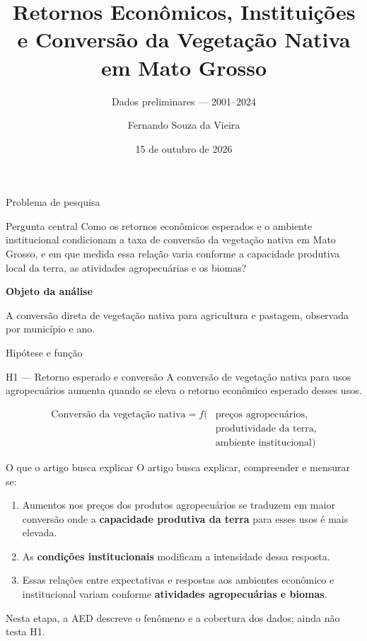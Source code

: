 \documentclass[aspectratio=169,11pt]{beamer}
\title[Retornos, instituições e conversão]{Retornos Econômicos, Instituições e Conversão da Vegetação Nativa em Mato Grosso}
\subtitle{Dados preliminares — 2001--2024}
\author{Fernando Souza da Vieira}
\institute{Tópicos em Microeconomia}
\date{15 de outubro de 2026}
\newcommand{\fonte}[1]{\par\vfill{\fontsize{7.5}{9}\selectfont\color{gray}#1\par}}
\begin{document}
\begin{frame}
  \titlepage
\end{frame}

\begin{frame}{Problema de pesquisa}
\begin{block}{Pergunta central}
Como os retornos econômicos esperados e o ambiente institucional condicionam a taxa de conversão da vegetação nativa em Mato Grosso, e em que medida essa relação varia conforme a capacidade produtiva local da terra, as atividades agropecuárias e os biomas?
\end{block}
\medskip
\textbf{Objeto da análise}\par\smallskip
A conversão direta de vegetação nativa para agricultura e pastagem, observada por município e ano.
\end{frame}

\begin{frame}{Hipótese e função}
\begin{block}{H1 — Retorno esperado e conversão}
A conversão de vegetação nativa para usos agropecuários aumenta quando se eleva o retorno econômico esperado desses usos.
\end{block}
\medskip
\begin{equation*}
\begin{aligned}
\text{Conversão da vegetação nativa}
  = f\bigl(&\text{preços agropecuários},\\
           &\text{produtividade da terra},\\
           &\text{ambiente institucional}\bigr)
\end{aligned}
\end{equation*}
\end{frame}

\begin{frame}{O que o artigo busca explicar}
O artigo busca explicar, compreender e mensurar se:
\medskip
\begin{enumerate}
\setlength{\itemsep}{4mm}
\item Aumentos nos preços dos produtos agropecuários se traduzem em maior conversão onde a \textbf{capacidade produtiva da terra} para esses usos é mais elevada.
\item As \textbf{condições institucionais} modificam a intensidade dessa resposta.
\item Essas relações entre expectativas e respostas aos ambientes econômico e institucional variam conforme \textbf{atividades agropecuárias e biomas}.
\end{enumerate}
\fonte{Nesta etapa, a AED descreve o fenômeno e a cobertura dos dados; ainda não testa H1.}
\end{frame}
\end{document}
